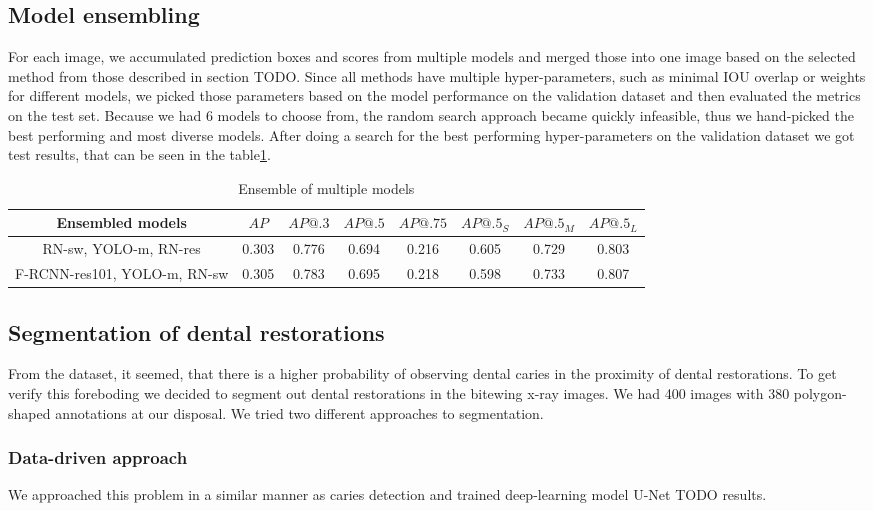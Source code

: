 \subsection{Model ensembling}
For each image, we accumulated prediction boxes and scores from multiple models and merged those into one image based on the selected method from those described in section TODO. Since all methods have multiple hyper-parameters, such as minimal IOU overlap or weights for different models, we picked those parameters based on the model performance on the validation dataset and then evaluated the metrics on the test set. Because we had 6 models to choose from, the random search approach became quickly infeasible, thus we hand-picked the best performing and most diverse models. After doing a search for the best performing hyper-parameters on the validation dataset we got test results, that can be seen in the table\ref{tab:model_ensembling}.
\begin{table}
    \begin{tabular}{c||c|c|c|c|c|c|c}
        Ensembled models             & $AP$  & $AP@.3$ & $AP@.5$ & $AP@.75$ & $AP@.5_S$ & $AP@.5_M$ & $AP@.5_L$ \\ \hline \hline
        RN-sw, YOLO-m, RN-res        & 0.303 & 0.776   & 0.694   & 0.216    & 0.605     & 0.729     & 0.803     \\ \hline
        F-RCNN-res101, YOLO-m, RN-sw & 0.305 & 0.783   & 0.695   & 0.218    & 0.598     & 0.733     & 0.807     \\
    \end{tabular}
    \caption{Ensemble of multiple models}
    \label{tab:model_ensembling}
\end{table}

\subsection{Segmentation of dental restorations}
From the dataset, it seemed, that there is a higher probability of observing dental caries in the proximity of dental restorations. To get verify this foreboding we decided to segment out dental restorations in the bitewing x-ray images. We had 400 images with 380 polygon-shaped annotations at our disposal. We tried two different approaches to segmentation.

\subsubsection{Data-driven approach}
We approached this problem in a similar manner as caries detection and trained deep-learning model U-Net TODO results.


